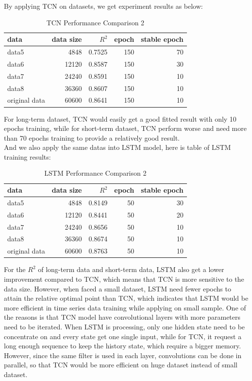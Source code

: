 By applying TCN on datasets, we get experiment results as below:
\begin{table}[H]
\centering
\caption{TCN Performance Comparison 2}
\begin{tabular}{l r r r r}
\toprule
\textbf{data}  & \textbf{data size}& \textbf{$R^2$} & \textbf{epoch}& \textbf{stable epoch}\\
\midrule
data5 & 4848 & 0.7525 & 150& 70\\
data6 & 12120 & 0.8587 & 150& 30 \\
data7 & 24240 & 0.8591 & 150& 10 \\
data8 & 36360 & 0.8607 & 150& 10 \\
original data & 60600 & 0.8641& 150& 10 \\
\bottomrule
\end{tabular}
\label{tab:TCN2}
\end{table}
For long-term dataset, TCN would easily get a good fitted result with only 10 epochs training, while for short-term dataset, TCN perform worse and need more than 70 epochs training to provide a relatively good result.\\
And we also apply the same datas into LSTM model, here is table of LSTM training results:
\begin{table}[H]
\centering
\caption{LSTM Performance Comparison 2}
\begin{tabular}{l r r r r}
\toprule
\textbf{data}  & \textbf{data size}& \textbf{$R^2$} & \textbf{epoch}& \textbf{stable epoch}\\
\midrule
data5 & 4848 & 0.8149 & 50& 30\\
data6 & 12120 & 0.8441 & 50& 20 \\
data7 & 24240 & 0.8656 & 50& 10 \\
data8 & 36360 & 0.8674 & 50& 10 \\
original data & 60600 & 0.8763& 50& 10 \\
\bottomrule
\end{tabular}
\label{tab:LSTM2}
\end{table}
For the $R^2$ of long-term data and short-term data, LSTM also get a lower improvement compared to TCN, which means that TCN is more sensitive to the data size. However, when faced a small dataset, LSTM need fewer epochs to attain the relative optimal point than TCN, which indicates that LSTM would be more efficient in time series data training while applying on small sample. One of the reasons is that TCN model have convolutional layers with more parameters need to be iterated. When LSTM is processing, only one hidden state need to be concentrate on and every state get one single input, while for TCN, it request a long enough sequence to keep the history state, which require a bigger memory. However, since the same filter is used in each layer, convolutions can be done in parallel, so that TCN would be more efficient on huge dataset instead of small dataset. \\

